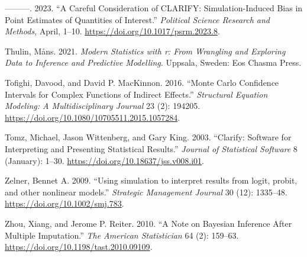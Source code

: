 \begin{CSLReferences}{1}{0}
\leavevmode{}%
---------. 2023. {``A Careful Consideration of {CLARIFY}: Simulation-Induced Bias in Point Estimates of Quantities of Interest.''} \emph{Political Science Research and Methods}, April, 1--10. \url{https://doi.org/10.1017/psrm.2023.8}.

\leavevmode{}%
Thulin, Måns. 2021. \emph{Modern Statistics with r: From Wrangling and Exploring Data to Inference and Predictive Modelling}. Uppsala, Sweden: Eos Chasma Press.

\leavevmode{}%
Tofighi, Davood, and David P. MacKinnon. 2016. {``Monte Carlo Confidence Intervals for Complex Functions of Indirect Effects.''} \emph{Structural Equation Modeling: A Multidisciplinary Journal} 23 (2): 194205. \url{https://doi.org/10.1080/10705511.2015.1057284}.

\leavevmode{}%
Tomz, Michael, Jason Wittenberg, and Gary King. 2003. {``Clarify: Software for Interpreting and Presenting Statistical Results.''} \emph{Journal of Statistical Software} 8 (January): 1--30. \url{https://doi.org/10.18637/jss.v008.i01}.

\leavevmode{}%
Zelner, Bennet A. 2009. {``Using simulation to interpret results from logit, probit, and other nonlinear models.''} \emph{Strategic Management Journal} 30 (12): 1335--48. \url{https://doi.org/10.1002/smj.783}.

\leavevmode{}%
Zhou, Xiang, and Jerome P. Reiter. 2010. {``A Note on Bayesian Inference After Multiple Imputation.''} \emph{The American Statistician} 64 (2): 159--63. \url{https://doi.org/10.1198/tast.2010.09109}.

\end{CSLReferences}


\address{%
Noah Greifer\\
Harvard University\\%
Institute for Quantitative Social Science\\ Cambridge, MA\\
%
ngreifer.github.io\\%
\textit{ORCiD: \href{https://orcid.org/0000-0003-3067-7154}{0000-0003-3067-7154}}\\%
\href{mailto:ngreifer@iq.harvard.edu}{\nolinkurl{ngreifer@iq.harvard.edu}}%
}

